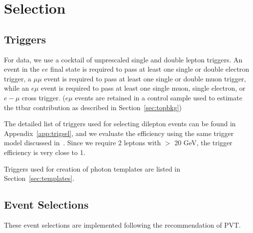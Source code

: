 
\section{Selection}
\label{sec:eventSelection}

\subsection{Triggers}
\label{sec:trigSel}

For data, we use a cocktail of unprescaled single 
and double lepton triggers. An event
in the $ee$ final state is required to pass at least one
single or double electron trigger, a
$\mu\mu$ event is required to pass at least one single 
or double muon trigger, while an $e\mu$ event
is required to pass at least one single muon, single electron, 
or $e-\mu$ cross trigger. ($e\mu$ events are retained in a control sample used to estimate the ttbar contribution as described in Section~\ref{sec:topbkg})

The detailed list of triggers used for selecting dilepton events can be found in Appendix~\ref{app:trigsel},
and we evaluate the efficiency using the same trigger model discussed in~\cite{ref:GenericOS}. Since we require
2 leptons with \pt $>$ 20 GeV, the trigger efficiency is very close to 1.

Triggers used for creation of photon templates are listed in Section~\ref{sec:templates}.


\subsection{Event Selections}

These event selections are implemented following the recommendation of PVT.

